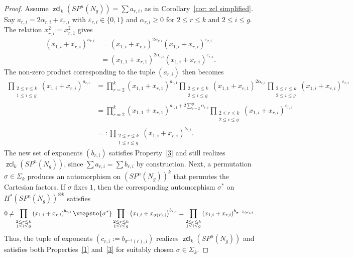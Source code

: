 \documentclass[amscd,amssymb,verbatim,10pt]{amsart}
\numberwithin{equation}{section}
\theoremstyle{plain}
\theoremstyle{definition}
\DeclareMathOperator{\zcl}{{\mathsf{zcl}}}
\begin{document}
\begin{proof}
Assume $\zcl_k(SP^n(N_g))=\sum a_{r,i}$, as in Corollary~\ref{cor: zcl simplified}. Say $a_{r,i}=2\alpha_{r,i}+\varepsilon_{r,i}$ with $\varepsilon_{r,i}\in \{0,1\}$ and $\alpha_{r,i}\ge 0$ for $2\le r\le k$ and $2\le i \le g$. The relation $x_{r,i}^2=x_{r,1}^2$ gives
\begin{align*}\left(x_{1,i}+x_{r,i}\right)^{a_{r,i}}&= \left(x_{1,i}+x_{r,i}\right)^{2\alpha_{r,i}} \left(x_{1,i}+x_{r,i}\right)^{\varepsilon_{r,i}} \\ & = \left(x_{1,1}+x_{r,1}\right)^{2\alpha_{r,i}} \left(x_{1,i}+x_{r,i}\right)^{\varepsilon_{r,i} }.
\end{align*}
The non-zero product corresponding to the tuple $(a_{r,i})$ then becomes
\begin{align*}
\prod_{\substack{2\le r\le k \\ 1\le i \le g}}\left(x_{1,i}+x_{r,i}\right)^{a_{r,i}}
& =\prod_{r=2}^k\left(x_{1,1}+x_{r,1}\right)^{a_{r,1}} \prod_{\substack{2\le r\le k \\ 2\le i \le g}}\left(x_{1,1}+x_{r,1}\right)^{2\alpha_{r,i}} \prod_{\substack{2\le r\le k \\ 2\le i \le g}}\left(x_{1,i}+x_{r,i}\right)^{\varepsilon_{r,i}}
\\
& =\prod_{r=2}^k\left(x_{1,1}+x_{r,1}\right)^{a_{r,1}+2\sum_{i=2}^g\alpha_{r,i}} \prod_{\substack{2\le r\le k \\ 2\le i \le g}}\left(x_{1,i}+x_{r,i}\right)^{\varepsilon_{r,i}}
\\
& =:\prod_{\substack{2\le r\le k \\ 1\le i \le g}}\left(x_{1,i}+x_{r,i}\right)^{b_{r,i}}.
\end{align*}
The new set of exponents $(b_{r,i})$ satisfies Property~\eqref{3} and still realizes $\zcl_k(SP^n(N_g))$, since $\sum a_{r,i}=\sum b_{r,i}$ by construction. Next, a permutation $\sigma\in\Sigma_k$ produces an automorphism on $(SP^n(N_g))^k$ that permutes the Cartesian factors. If $\sigma$ fixes $1$, then the corresponding automorphism $\sigma^*$ on $H^*(SP^n(N_g))^{\otimes k}$ satisfies
\[
0\ne \prod_{\substack{2\le r\le k \\ 1\le i \le g}}\left(x_{1,i}+x_{r,i}\right)^{b_{r,i}} \xmapsto{\sigma^*}  \prod_{\substack{2\le r\le k \\ 1\le i \le g}}\left(x_{1,i}+x_{\sigma(r),i}\right)^{b_{r,i}}= \prod_{\substack{2\le r\le k \\ 1\le i \le g}}\left(x_{1,i}+x_{r,i}\right)^{b_{\sigma^{-1}(r),i}} .
\]
Thus, the tuple of exponents $(c_{r,i}:=b_{\sigma^{-1}(r),i})$ realizes $\zcl_k(SP^n(N_g))$ and satisfies both Properties~\eqref{1} and~\eqref{3} for suitably chosen $\sigma\in\Sigma_k$.


\end{proof}
\end{document}
